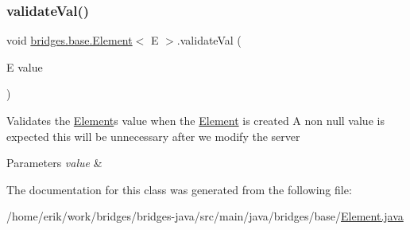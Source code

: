 \mbox{\label{classbridges_1_1base_1_1_element_af1a60f4e6a91d379179f7d56e6dc3829}} 
\subsubsection{\texorpdfstring{validate\+Val()}{validateVal()}}
{\footnotesize\ttfamily void \hyperlink{classbridges_1_1base_1_1_element}{bridges.\+base.\+Element}$<$ E $>$.validate\+Val (\begin{DoxyParamCaption}\item[{E}]{value }\end{DoxyParamCaption})\hspace{0.3cm}{\ttfamily [protected]}}

Validates the \hyperlink{classbridges_1_1base_1_1_element}{Element}\textquotesingle{}s value when the \hyperlink{classbridges_1_1base_1_1_element}{Element} is created A non null value is expected this will be unnecessary after we modify the server 
\begin{DoxyParams}{Parameters}
{\em value} & \\
\hline
\end{DoxyParams}


The documentation for this class was generated from the following file\+:\begin{DoxyCompactItemize}
\item 
/home/erik/work/bridges/bridges-\/java/src/main/java/bridges/base/\hyperlink{_element_8java}{Element.\+java}\end{DoxyCompactItemize}
